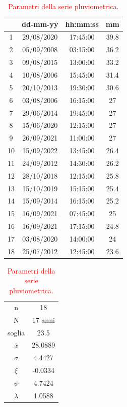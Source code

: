 \begin{table}[H]
    \begin{minipage}{.5\linewidth}
      \caption{\textcolor{red}{Campione della serie pluviometrica.}}
      \centering
        \begin{tabular}{cccc}
            \toprule
            & dd-mm-yy   & hh:mm:ss & mm \\
            \midrule
         1  & 29/08/2020 & 17:45:00 & 39.8 \\
         2  & 05/09/2008 & 03:15:00 & 36.2 \\
         3  & 09/08/2015 & 13:00:00 & 33.2 \\
         4  & 10/08/2006 & 15:45:00 & 31.4 \\
         5  & 20/10/2013 & 19:30:00 & 30.6 \\
         6  & 03/08/2006 & 16:15:00 & 27   \\
         7  & 29/06/2014 & 19:45:00 & 27   \\
         8  & 15/06/2020 & 12:15:00 & 27   \\
         9  & 26/09/2021 & 11:00:00 & 27   \\
         10 & 15/09/2022 & 13:45:00 & 26.4 \\
         11 & 24/09/2012 & 14:30:00 & 26.2 \\
         12 & 28/10/2018 & 12:15:00 & 25.8 \\
         13 & 15/10/2019 & 15:15:00 & 25.4 \\
         14 & 15/09/2014 & 16:15:00 & 25.2 \\
         15 & 16/09/2021 & 07:45:00 & 25   \\
         16 & 16/09/2021 & 17:15:00 & 24.8 \\
         17 & 03/08/2020 & 14:00:00 & 24   \\
         18 & 25/07/2012 & 12:45:00 & 23.6 \\
         \bottomrule
        \end{tabular}
    \end{minipage}%
    \begin{minipage}{.5\linewidth}
      \centering
        \caption{\textcolor{red}{Parametri della serie pluviometrica.}}
        \begin{tabular}{cc}
            \toprule
        n        &     18    \\
        N        & 17 anni \\
        soglia   &    23.5     \\
        $\bar{x}$ &  28.0889      \\
        $\sigma$ &    4.4427     \\
        $\xi$      &  -0.0334     \\
        $\psi$      &  4.7424   \\
        $\lambda$   &  1.0588  \\
    \bottomrule     
        \end{tabular}
    \end{minipage} 
\end{table}

